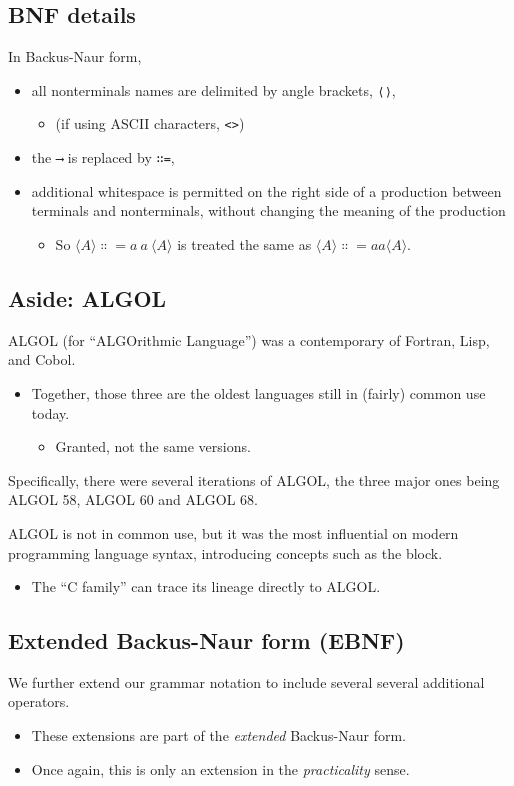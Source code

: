 \documentclass[11pt]{article}
\theoremstyle{definition}
\begin{document}
\subsection{BNF details}
\label{sec:org0e9b6ea}
In Backus-Naur form,
\begin{itemize}
\item all nonterminals names are delimited by
angle brackets, \texttt{⟨⟩},
\begin{itemize}
\item (if using ASCII characters, \texttt{<>})
\end{itemize}
\item the \texttt{⟶} is replaced by \texttt{∷=},
\item additional whitespace is permitted on the right side
of a production between terminals and nonterminals,
without changing the meaning of the production
\begin{itemize}
\item So \(⟨A⟩ ∷= a\ a\ ⟨A⟩\) is treated the same as \(⟨A⟩ ∷= aa⟨A⟩\).
\end{itemize}
\end{itemize}

\subsection{Aside: ALGOL}
\label{sec:org27c6315}
ALGOL (for “ALGOrithmic Language”)
was a contemporary of Fortran, Lisp, and Cobol.
\begin{itemize}
\item Together, those three are the oldest languages
still in (fairly) common use today.
\begin{itemize}
\item Granted, not the same versions.
\end{itemize}
\end{itemize}

Specifically, there were several iterations of ALGOL,
the three major ones being ALGOL 58, ALGOL 60 and ALGOL 68.

ALGOL is not in common use, but it was
the most influential on modern programming language syntax,
introducing concepts such as the block.
\begin{itemize}
\item The “C family” can trace its lineage directly to ALGOL.
\end{itemize}

\subsection{Extended Backus-Naur form (EBNF)}
\label{sec:orgc7b4fce}
We further extend our grammar notation to include several
several additional operators.
\begin{itemize}
\item These extensions are part of the \emph{extended} Backus-Naur form.
\item Once again, this is only an extension in the \emph{practicality} sense.
\end{itemize}
\end{document}
